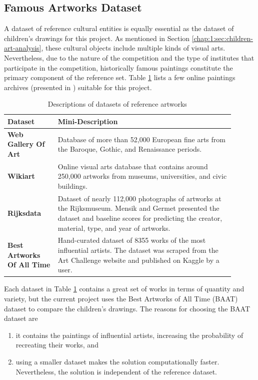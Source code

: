 \subsection{Famous Artworks Dataset}

A dataset of reference cultural entities is equally essential as the dataset of children's drawings for this project. As mentioned in Section \ref{chap:1:sec:children-art-analysis}, these cultural objects include multiple kinds of visual arts. Nevertheless, due to the nature of the competition and the type of institutes that participate in the competition, historically famous paintings constitute the primary component of the reference set. Table \ref{table:artworks-datasets} lists a few online paintings archives (presented in \cite{seguin_2016}) suitable for this project.

\begin{table}[ht]
    \centering
    \begin{tabular}{|p{0.2\linewidth}|p{0.7\linewidth}|}
    \hline
        \textbf{Dataset} & \textbf{Mini-Description} \\ \hline
        \textbf{Web Gallery Of Art} \cite{wga} & Database of more than 52,000 European fine arts from the Baroque, Gothic, and Renaissance periods. \\ \hline
        \textbf{Wikiart} \cite{wikiart} & Online visual arts database that contains around 250,000 artworks from museums, universities, and civic buildings. \\ \hline
        \textbf{Rijksdata} \cite{mensink14rijkschallenge} & Dataset of nearly 112,000 photographs of artworks at the Rijksmuseum. Mensik and Germet presented the dataset and baseline scores for predicting the creator, material, type, and year of artworks.\\ \hline
        \textbf{Best Artworks Of All Time} \cite{icaro19baat} & Hand-curated dataset of 8355 works of the most influential artists. The dataset was scraped from the Art Challenge website \cite{ruben_anna_2014} and published on Kaggle by a user. \\ \hline
    \end{tabular}
    \caption{Descriptions of datasets of reference artworks}
    \label{table:artworks-datasets}
\end{table}

Each dataset in Table \ref{table:artworks-datasets} contains a great set of works in terms of quantity and variety, but the current project uses the Best Artworks of All Time (BAAT) dataset to compare the children's drawings. The reasons for choosing the BAAT dataset are 
\begin{enumerate}
	\item it contains the paintings of influential artists, increasing the probability of recreating their works, and
	\item using a smaller dataset makes the solution computationally faster. Nevertheless, the solution is independent of the reference dataset.
\end{enumerate}

